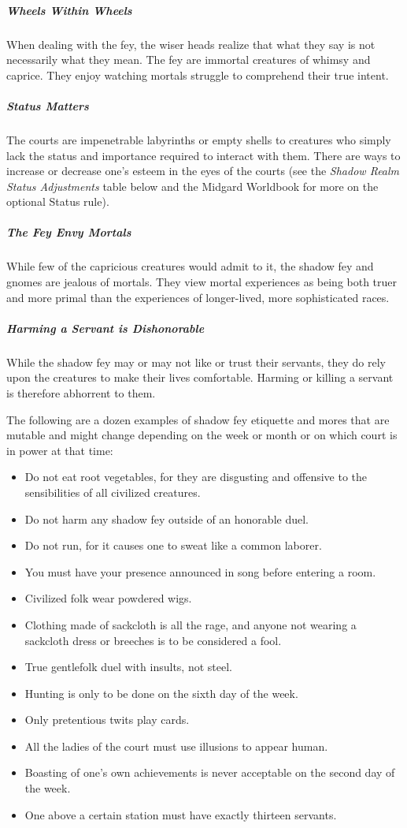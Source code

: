 \documentclass[10pt,a4paper,twoside,bg=print,twocolumn,openany,nodeprecatedcode]{dndbook}
\begin{document}
\subparagraph{Wheels Within Wheels}
When dealing with the fey, the wiser heads realize that what they say is not necessarily what they mean. The fey are immortal creatures of whimsy and caprice. They enjoy watching mortals struggle to comprehend their true intent.

\subparagraph{Status Matters}
The courts are impenetrable labyrinths or empty shells to creatures who simply lack the status and importance required to interact with them. There are ways to increase or decrease one's esteem in the eyes of the courts (see the \textit{Shadow Realm Status Adjustments} table below and the Midgard Worldbook for more on the optional Status rule).

\subparagraph{The Fey Envy Mortals}
While few of the capricious creatures would admit to it, the shadow fey and gnomes are jealous of mortals. They view mortal experiences as being both truer and more primal than the experiences of longer-lived, more sophisticated races.

\subparagraph{Harming a Servant is Dishonorable}
While the shadow fey may or may not like or trust their servants, they do rely upon the creatures to make their lives comfortable. Harming or killing a servant is therefore abhorrent to them.

The following are a dozen examples of shadow fey etiquette and mores that are mutable and might change depending on the week or month or on which court is in power at that time:


\begin{itemize}
\item Do not eat root vegetables, for they are disgusting and offensive to the sensibilities of all civilized creatures.
\item Do not harm any shadow fey outside of an honorable duel.
\item Do not run, for it causes one to sweat like a common laborer.
\item You must have your presence announced in song before entering a room.
\item Civilized folk wear powdered wigs.
\item Clothing made of sackcloth is all the rage, and anyone not wearing a sackcloth dress or breeches is to be considered a fool.
\item True gentlefolk duel with insults, not steel.
\item Hunting is only to be done on the sixth day of the week.
\item Only pretentious twits play cards.
\item All the ladies of the court must use illusions to appear human.
\item Boasting of one's own achievements is never acceptable on the second day of the week.
\item One above a certain station must have exactly thirteen servants.
\end{itemize}
\end{document}
